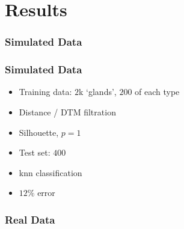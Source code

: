 \section{Results}


\begin{frame}[label=simulated]
    \frametitle{Simulated Data}

    \begin{block}{}
        \centering
    \end{block}
\end{frame}

\begin{frame}
    \frametitle{Simulated Data}

    \begin{block}{}
        \begin{itemize}
            \item Training data: $2$k `glands', $200$ of each type 
            \item Distance / DTM filtration
            \item Silhouette, $p=1$
            \item Test set: $400$
            \item knn classification
            \item $12\%$ error
        \end{itemize}
    \end{block}

\end{frame}


\begin{frame}
    \frametitle{Real Data}

    \begin{block}{}
        \centering
    \end{block}
\end{frame}



